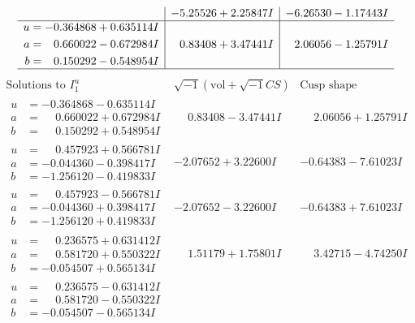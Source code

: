 \documentclass[1p]{elsarticle_modified}
\theoremstyle{definition}
\newcommand{\I}{\sqrt{-1}}
\begin{document}
$$\begin{array}{c|c|c}
 & -5.25526 + 2.25847 I & -6.26530 - 1.17443 I \\ \hline\begin{aligned}
u &= -0.364868 + 0.635114 I \\
a &= \phantom{-}0.660022 - 0.672984 I \\
b &= \phantom{-}0.150292 - 0.548954 I\end{aligned}
 & \phantom{-}0.83408 + 3.47441 I & \phantom{-}2.06056 - 1.25791 I\\
 \hline 
 \end{array}$$\newpage$$\begin{array}{c|c|c}  
\text{Solutions to }I^u_{1}& \I (\text{vol} + \sqrt{-1}CS) & \text{Cusp shape}\\
 \hline 
\begin{aligned}
u &= -0.364868 - 0.635114 I \\
a &= \phantom{-}0.660022 + 0.672984 I \\
b &= \phantom{-}0.150292 + 0.548954 I\end{aligned}
 & \phantom{-}0.83408 - 3.47441 I & \phantom{-}2.06056 + 1.25791 I \\ \hline\begin{aligned}
u &= \phantom{-}0.457923 + 0.566781 I \\
a &= -0.044360 - 0.398417 I \\
b &= -1.256120 - 0.419833 I\end{aligned}
 & -2.07652 + 3.22600 I & -0.64383 - 7.61023 I \\ \hline\begin{aligned}
u &= \phantom{-}0.457923 - 0.566781 I \\
a &= -0.044360 + 0.398417 I \\
b &= -1.256120 + 0.419833 I\end{aligned}
 & -2.07652 - 3.22600 I & -0.64383 + 7.61023 I \\ \hline\begin{aligned}
u &= \phantom{-}0.236575 + 0.631412 I \\
a &= \phantom{-}0.581720 + 0.550322 I \\
b &= -0.054507 + 0.565134 I\end{aligned}
 & \phantom{-}1.51179 + 1.75801 I & \phantom{-}3.42715 - 4.74250 I \\ \hline\begin{aligned}
u &= \phantom{-}0.236575 - 0.631412 I \\
a &= \phantom{-}0.581720 - 0.550322 I \\
b &= -0.054507 - 0.565134 I\end{aligned}

\end{array}$$
\end{document}
